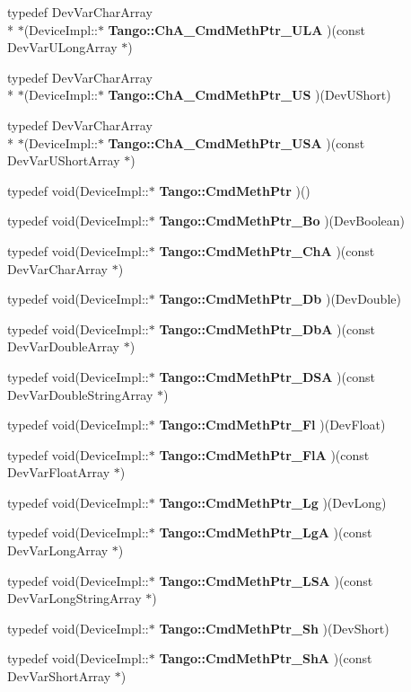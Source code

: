 \begin{DoxyCompactItemize}
typedef Dev\-Var\-Char\-Array \\*
$\ast$(Device\-Impl\-::$\ast$ {\bf Tango\-::\-Ch\-A\-\_\-\-Cmd\-Meth\-Ptr\-\_\-\-U\-L\-A} )(const Dev\-Var\-U\-Long\-Array $\ast$)
\item 
typedef Dev\-Var\-Char\-Array \\*
$\ast$(Device\-Impl\-::$\ast$ {\bf Tango\-::\-Ch\-A\-\_\-\-Cmd\-Meth\-Ptr\-\_\-\-U\-S} )(Dev\-U\-Short)
\item 
typedef Dev\-Var\-Char\-Array \\*
$\ast$(Device\-Impl\-::$\ast$ {\bf Tango\-::\-Ch\-A\-\_\-\-Cmd\-Meth\-Ptr\-\_\-\-U\-S\-A} )(const Dev\-Var\-U\-Short\-Array $\ast$)
\item 
typedef void(Device\-Impl\-::$\ast$ {\bf Tango\-::\-Cmd\-Meth\-Ptr} )()
\item 
typedef void(Device\-Impl\-::$\ast$ {\bf Tango\-::\-Cmd\-Meth\-Ptr\-\_\-\-Bo} )(Dev\-Boolean)
\item 
typedef void(Device\-Impl\-::$\ast$ {\bf Tango\-::\-Cmd\-Meth\-Ptr\-\_\-\-Ch\-A} )(const Dev\-Var\-Char\-Array $\ast$)
\item 
typedef void(Device\-Impl\-::$\ast$ {\bf Tango\-::\-Cmd\-Meth\-Ptr\-\_\-\-Db} )(Dev\-Double)
\item 
typedef void(Device\-Impl\-::$\ast$ {\bf Tango\-::\-Cmd\-Meth\-Ptr\-\_\-\-Db\-A} )(const Dev\-Var\-Double\-Array $\ast$)
\item 
typedef void(Device\-Impl\-::$\ast$ {\bf Tango\-::\-Cmd\-Meth\-Ptr\-\_\-\-D\-S\-A} )(const Dev\-Var\-Double\-String\-Array $\ast$)
\item 
typedef void(Device\-Impl\-::$\ast$ {\bf Tango\-::\-Cmd\-Meth\-Ptr\-\_\-\-Fl} )(Dev\-Float)
\item 
typedef void(Device\-Impl\-::$\ast$ {\bf Tango\-::\-Cmd\-Meth\-Ptr\-\_\-\-Fl\-A} )(const Dev\-Var\-Float\-Array $\ast$)
\item 
typedef void(Device\-Impl\-::$\ast$ {\bf Tango\-::\-Cmd\-Meth\-Ptr\-\_\-\-Lg} )(Dev\-Long)
\item 
typedef void(Device\-Impl\-::$\ast$ {\bf Tango\-::\-Cmd\-Meth\-Ptr\-\_\-\-Lg\-A} )(const Dev\-Var\-Long\-Array $\ast$)
\item 
typedef void(Device\-Impl\-::$\ast$ {\bf Tango\-::\-Cmd\-Meth\-Ptr\-\_\-\-L\-S\-A} )(const Dev\-Var\-Long\-String\-Array $\ast$)
\item 
typedef void(Device\-Impl\-::$\ast$ {\bf Tango\-::\-Cmd\-Meth\-Ptr\-\_\-\-Sh} )(Dev\-Short)
\item 
typedef void(Device\-Impl\-::$\ast$ {\bf Tango\-::\-Cmd\-Meth\-Ptr\-\_\-\-Sh\-A} )(const Dev\-Var\-Short\-Array $\ast$)

\end{DoxyCompactItemize}
